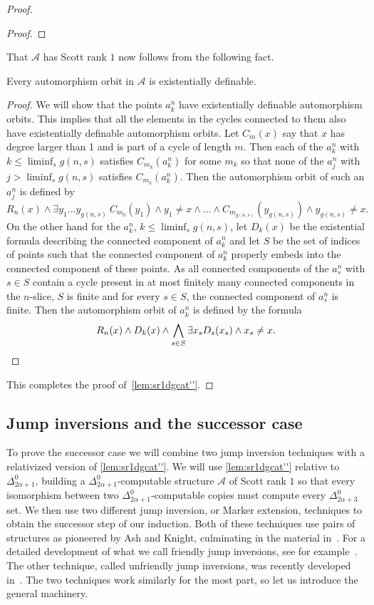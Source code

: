 \documentclass[10pt,a4paper]{amsart}
\newcommand\+[1]{\mathcal{#1}}
\renewcommand\*[1]{\mathbf{#1}}
\renewcommand\=[1]{\text{#1}}
\renewcommand\*[1]{\mathbf{#1}}
\newcommand{\A}{\mathcal{A}}
\begin{document}
\begin{proof}
\begin{proof}
 \end{proof}
 That $\A$ has Scott rank $1$ now follows from the following fact.
 \begin{claim}
   Every automorphism orbit in $\A$ is existentially definable.
 \end{claim}
 \begin{proof}
   We will show that the points $a_k^n$ have existentially definable automorphism orbits. This implies that all the elements in the cycles connected to them also have existentially definable automorphism orbits. Let $C_m(x)$ say that $x$ has degree larger than 1 and is part of a cycle of length $m$. Then each of the $a_k^n$ with $k\leq \liminf_s g(n,s)$ satisfies $C_{m_k}(a_k^n)$ for some $m_k$ so that none of the $a_j^n$ with $j>\liminf_s g(n,s)$ satisfies $C_{m_k}(a_k^n)$. Then the automorphism orbit of such an $a_j^n$ is defined by 
   \[ R_n(x)\land \exists y_1\dots y_{g(n,s)} \ C_{m_0}(y_1)\land y_1\neq x\land \dots \land C_{m_{g(n,s)}}(y_{g(n,s)}) \land y_{g(n,s)}\neq x. \]
   On the other hand for the $a_k^n$, $k\leq \liminf_s g(n,s)$, let $D_k(x)$ be the existential formula describing the connected component of $a_k^n$ and let $S$ be the set of indices of points such that the connected component of $a_k^n$ properly embeds into the connected component of these points. 
As all connected components of the $a_s^n$ with $s\in S$ contain a cycle present in at most finitely many connected components in the $n$-slice, $S$ is finite and for every $s\in S$, the connected component of $a_s^n$ is finite. 
    Then the automorphism orbit of $a_k^n$ is defined by the formula
   \[ R_n(x)\land D_k(x) \land \bigwedge_{s\in S} \exists x_s D_s(x_s) \land x_s\neq x.\qedhere\]
 \end{proof}
 This completes the proof of~\cref{lem:sr1dgcat''}.
 \end{proof}
\subsection{Jump inversions and the successor case}
To prove the successor case we will combine two jump inversion techniques with a relativized version of \cref{lem:sr1dgcat''}. We will use \cref{lem:sr1dgcat''} relative to $\Delta^0_{2\alpha+1}$, building a $\Delta^0_{2\alpha+1}$-computable structure $\+A$ of Scott rank $1$ so that every isomorphism between two $\Delta^0_{2\alpha+1}$-computable copies must compute every $\Delta^0_{2\alpha+3}$ set. We then use two different jump inversion, or Marker extension, techniques to obtain the successor step of our induction. Both of these techniques use pairs of structures as pioneered by Ash and Knight, culminating in the material in~\cite{ash2000}. For a detailed development of what we call friendly jump inversions, see for example~\cite[Chapter X.3]{montalban2025}. The other technique, called unfriendly jump inversions, was recently developed in~\cite{harrison-trainor2025}. The two techniques work similarly for the most part, so let us introduce the general machinery.
\end{document}
